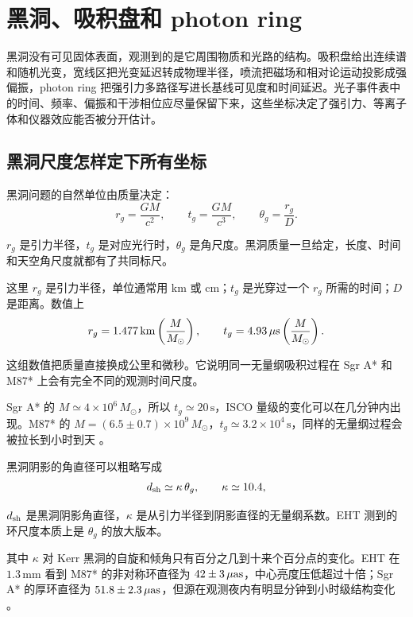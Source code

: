 \chapter{黑洞、吸积盘和 photon ring}
\label{chap:12}

\begin{chapteropening}
黑洞没有可见固体表面，观测到的是它周围物质和光路的结构。吸积盘给出连续谱和随机光变，宽线区把光变延迟转成物理半径，喷流把磁场和相对论运动投影成强偏振，photon ring 把强引力多路径写进长基线可见度和时间延迟。光子事件表中的时间、频率、偏振和干涉相位应尽量保留下来，这些坐标决定了强引力、等离子体和仪器效应能否被分开估计。
\end{chapteropening}

\section{黑洞尺度怎样定下所有坐标}

黑洞问题的自然单位由质量决定：
\begin{equation}
  r_g=\frac{GM}{c^2},\qquad
  t_g=\frac{GM}{c^3},\qquad
  \theta_g=\frac{r_g}{D}.
  \label{eq:ch12-01}
\end{equation}
\begin{formulaexplain}
\(r_g\) 是引力半径，\(t_g\) 是对应光行时，\(\theta_g\) 是角尺度。黑洞质量一旦给定，长度、时间和天空角尺度就都有了共同标尺。
\end{formulaexplain}
这里 \(r_g\) 是引力半径，单位通常用 \(\mathrm{km}\) 或 \(\mathrm{cm}\)；\(t_g\) 是光穿过一个 \(r_g\) 所需的时间；\(D\) 是距离。数值上
\begin{equation}
  r_g=1.477\,{\rm km}\left(\frac{M}{M_\odot}\right),\qquad
  t_g=4.93\,\mu{\rm s}\left(\frac{M}{M_\odot}\right).
  \label{eq:ch12-02}
\end{equation}
\begin{formulaexplain}
这组数值把质量直接换成公里和微秒。它说明同一无量纲吸积过程在 Sgr A* 和 M87* 上会有完全不同的观测时间尺度。
\end{formulaexplain}
Sgr A* 的 \(M\simeq4\times10^6\,M_\odot\)，所以 \(t_g\simeq20\,\mathrm{s}\)，ISCO 量级的变化可以在几分钟内出现。M87* 的 \(M=(6.5\pm0.7)\times10^9\,M_\odot\)，\(t_g\simeq3.2\times10^4\,\mathrm{s}\)，同样的无量纲过程会被拉长到小时到天 \citep{2019ApJ...875L...1E,2019ApJ...875L...6E,2022ApJ...930L..12E}。

黑洞阴影的角直径可以粗略写成
\begin{equation}
  d_{\rm sh}\simeq \kappa\,\theta_g,\qquad \kappa\simeq 10.4 ,
  \label{eq:ch12-03}
\end{equation}
\begin{formulaexplain}
\(d_{\rm sh}\) 是黑洞阴影角直径，\(\kappa\) 是从引力半径到阴影直径的无量纲系数。EHT 测到的环尺度本质上是 \(\theta_g\) 的放大版本。
\end{formulaexplain}
其中 \(\kappa\) 对 Kerr 黑洞的自旋和倾角只有百分之几到十来个百分点的变化。EHT 在 \(1.3\,\mathrm{mm}\) 看到 M87* 的非对称环直径为 \(42\pm3\,\mu{\rm as}\)，中心亮度压低超过十倍；Sgr A* 的厚环直径为 \(51.8\pm2.3\,\mu{\rm as}\)，但源在观测夜内有明显分钟到小时级结构变化 \citep{2019ApJ...875L...4E,2019ApJ...875L...5E,2022ApJ...930L..14E,2022ApJ...930L..15E}。

